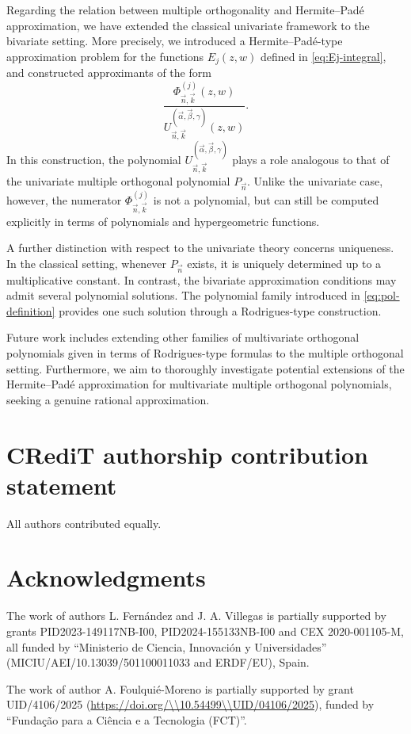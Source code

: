 \documentclass[11pt,reqno]{amsart}
\theoremstyle{definition}
\begin{document}
Regarding the relation between multiple orthogonality and Hermite--Padé approximation, we have extended the classical univariate framework to the bivariate setting. More precisely, we introduced a Hermite--Padé-type approximation problem for the functions $E_j(z,w)$ defined in \eqref{eq:Ej-integral}, and constructed approximants of the form
\[
\frac{\Phi_{\vec n,\vec k}^{(j)}(z,w)}
     {U_{\vec n,\vec k}^{(\vec\alpha,\vec\beta,\gamma)}(z,w)}.
\]
In this construction, the polynomial
$U_{\vec n,\vec k}^{(\vec\alpha,\vec\beta,\gamma)}$
plays a role analogous to that of the univariate multiple orthogonal polynomial
$P_{\vec n}$.
Unlike the univariate case, however, the numerator
$\Phi_{\vec n,\vec k}^{(j)}$
is not a polynomial, but can still be computed explicitly in terms of polynomials and hypergeometric functions.

A further distinction with respect to the univariate theory concerns uniqueness. In the classical setting, whenever $P_{\vec n}$ exists, it is uniquely determined up to a multiplicative constant. In contrast, the bivariate approximation conditions may admit several polynomial solutions. The polynomial family introduced in \eqref{eq:pol-definition} provides one such solution through a Rodrigues-type construction.



Future work includes extending other families of multivariate orthogonal polynomials given in terms of Rodrigues-type formulas to the multiple orthogonal setting. Furthermore, we aim to 
thoroughly investigate potential extensions of the Hermite--Pad\'{e} 
approximation for multivariate multiple orthogonal polynomials, seeking a 
genuine rational approximation.


\section*{CRediT authorship contribution statement}

All authors contributed equally.



\section*{Acknowledgments}


The work of authors L. Fernández and J. A. Villegas is partially supported by grants PID2023-149117NB-I00, PID2024-155133NB-I00 and CEX
2020-001105-M, all funded by ``Ministerio de Ciencia, Innovación y Universidades'' (MICIU/AEI/10.13039/501100011033 and ERDF/EU), Spain. 

The work of author A. Foulquié-Moreno is partially supported by grant UID/4106/2025 (\url{https://doi.org/\\10.54499\\UID/04106/2025}), funded by ``Fundação para a Ciência e a Tecnologia (FCT)''.




{}
\end{document}
